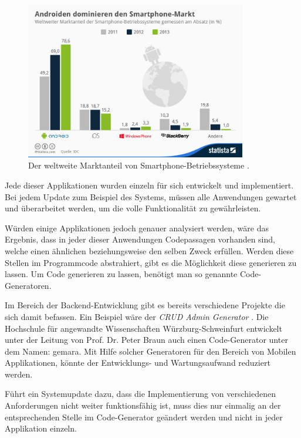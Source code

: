 \begin{figure}[H]
	\begin{center}
		\includegraphics[width=0.86\textwidth]{images/os.jpg}
		\caption{Der weltweite Marktanteil von Smartphone-Betriebssysteme \cite{os}.}
		\label{fig:os_fig}
	\end{center}
\end{figure}

Jede dieser Applikationen wurden einzeln für sich entwickelt und implementiert. Bei jedem Update zum Beispiel des Systems, müssen alle Anwendungen gewartet und überarbeitet werden, um die volle Funktionalität zu gewährleisten.

Würden einige Applikationen jedoch genauer analysiert werden, wäre das Ergebnis, dass in jeder dieser Anwendungen Codepassagen vorhanden sind, welche einen ähnlichen beziehungsweise den selben Zweck erfüllen. Werden diese Stellen im Programmcode abstrahiert, gibt es die Möglichkeit diese generieren zu lassen. Um Code generieren zu lassen, benötigt man so genannte Code-Generatoren. 

Im Bereich der Backend-Entwicklung gibt es bereits verschiedene Projekte die sich damit befassen. Ein Beispiel wäre der \textit{CRUD Admin Generator} \cite{generators}. Die Hochschule für angewandte Wissenschaften Würzburg-Schweinfurt entwickelt  unter der Leitung von Prof. Dr. Peter Braun auch einen Code-Generator unter dem Namen: \ac{gemara}. Mit Hilfe solcher Generatoren für den Bereich von Mobilen Applikationen, könnte der Entwicklungs- und Wartungsaufwand reduziert werden. 

Führt ein Systemupdate dazu, dass die Implementierung von verschiedenen Anforderungen nicht weiter funktionsfähig ist, muss dies nur einmalig an der entsprechenden Stelle im Code-Generator geändert werden und nicht in jeder Applikation einzeln. 


